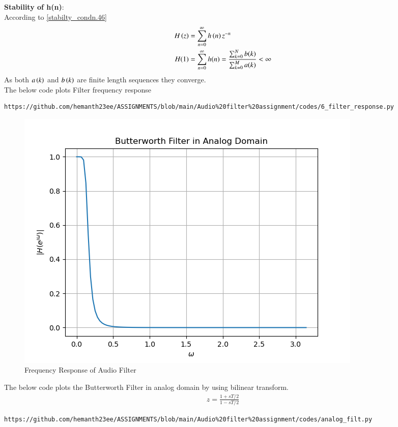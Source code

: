 \documentclass[journal,12pt,twocolumn]{IEEEtran}
\theoremstyle{remark}
\begin{document}
\begin{enumerate}
\textbf{Stability of h(n)}:\\
According to \eqref{stabilty_condn.46}
\begin{align}
H\left(z\right) &= \sum_{n = 0}^{\infty} h\left(n\right)z^{-n}\\
H(1)&= \sum_{n = 0}^{\infty}h(n)  = \frac{\sum_{k = 0}^{N}b(k)}{\sum_{k = 0}^{M}a(k)}< \infty
\end{align}
As both $a\left(k\right)$ and $b\left(k\right)$ are finite length sequences they converge.\\
The below code plots Filter frequency response
\begin{lstlisting}
https://github.com/hemanth23ee/ASSIGNMENTS/blob/main/Audio%20filter%20assignment/codes/6_filter_response.py
\end{lstlisting}
\begin{figure}[H]
\centering
\includegraphics[width=1\columnwidth]{figs/Filter_Response.png}
\caption{Frequency Response of Audio Filter}
\label{H(w)_6.46}
\end{figure}
The below code plots the Butterworth Filter in analog domain by using bilinear transform.
\begin{align}
    z=\frac{1+sT/2}{1-sT/2}
\end{align}
\begin{lstlisting}
https://github.com/hemanth23ee/ASSIGNMENTS/blob/main/Audio%20filter%20assignment/codes/analog_filt.py
\end{lstlisting}
\begin{figure}[H]
\centering

\end{figure}
\end{enumerate}
\end{document}
